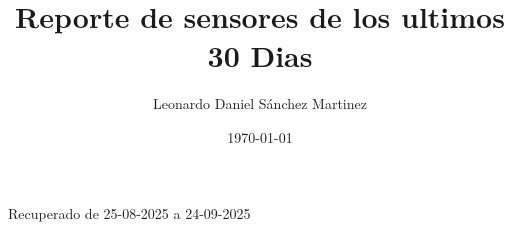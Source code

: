 \documentclass{article}
\title{Reporte de sensores de los ultimos 30 Dias}
\author{Leonardo Daniel Sánchez Martinez}
\date{\today}
\begin{document}
    \maketitle
    Recuperado de 25-08-2025 a 24-09-2025



    
\end{document}

